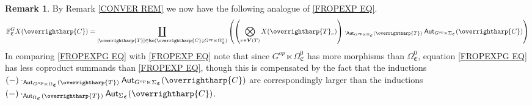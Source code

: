 \documentclass[a4paper,10pt
,draft
]{article}%
\numberwithin{equation}{section}
\numberwithin{figure}{section}
\theoremstyle{definition} %
\newtheorem{remark}[equation]{Remark}%
\newcommand{\vect}[1]{\text{\overrightharp{\ensuremath{#1}}}}
\newcommand{\1}{\ensuremath{\mathbbm 1}}%
\begin{document}
\begin{remark}\label{FROPEXPG REM}
By Remark \ref{CONVER REM} we now have the following analogue of
\eqref{FROPEXP EQ}.
\begin{equation}\label{FROPEXPG EQ}
\mathbb{F}^G_{\mathfrak{C}} X (\vect{C})
=
\coprod_{[\vect{T}] \in 
\mathsf{Iso}(\vect{C} \downarrow G^{op} \ltimes \Omega^0_{\mathfrak{C}})}
\left(
\left(
\bigotimes_{v \in \boldsymbol{V}(T)} X(\vect{T}_v)
\right)
\cdot_{\mathsf{Aut}_{G^{op} \ltimes \Omega_{\mathfrak{C}}}(\vect{T})}
\mathsf{Aut}_{G^{op} \ltimes \Sigma_{\mathfrak{C}}}(\vect{C})
\right)
\end{equation}
In comparing \eqref{FROPEXPG EQ} with \eqref{FROPEXP EQ} note that since 
$G^{op} \ltimes \Omega^0_{\mathfrak{C}}$
has more morphisms than
$\Omega^0_{\mathfrak{C}}$,
equation \eqref{FROPEXPG EQ} has less coproduct summands than \eqref{FROPEXP EQ},
though this is compensated by the fact that the inductions
$(-)\cdot_{\mathsf{Aut}_{G^{op} \ltimes \Omega_{\mathfrak{C}}}(\vect{T})}
\mathsf{Aut}_{G^{op} \ltimes \Sigma_{\mathfrak{C}}}(\vect{C})$
are correspondingly larger than the inductions
$(-)\cdot_{\mathsf{Aut}_{\Omega_{\mathfrak{C}}}(\vect{T})}
\mathsf{Aut}_{\Sigma_{\mathfrak{C}}}(\vect{C})$.
\end{remark}
\end{document}
